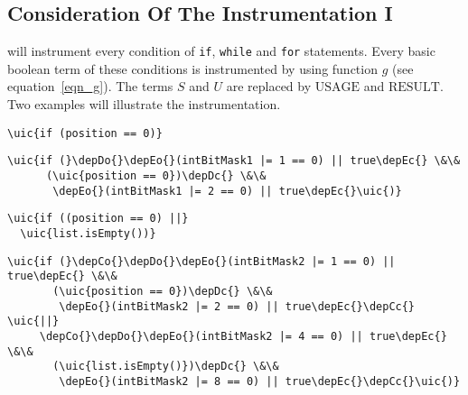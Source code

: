 \subsection{Consideration Of The Instrumentation I}
\gbt will instrument every condition of \texttt{if}, \texttt{while} and \texttt{for} statements. Every basic boolean term of these conditions is instrumented by using function $g$ (see equation~\eqref{eqn_g}). The terms $S$ and $U$ are replaced by $\text{USAGE}$ and $\text{RESULT}$. Two examples will illustrate the instrumentation.

\begin{minipage}[t]{0.35\textwidth}
\begin{Verbatim}[commandchars=\\\{\}]
\uic{if (position == 0)}
\end{Verbatim}
\end{minipage}
\begin{minipage}[t]{0.65\textwidth}
\begin{Verbatim}[commandchars=\\\{\}]
\uic{if (}\depDo{}\depEo{}(intBitMask1 |= 1 == 0) || true\depEc{} \&\&
      (\uic{position == 0})\depDc{} \&\&
       \depEo{}(intBitMask1 |= 2 == 0) || true\depEc{}\uic{)}
\end{Verbatim}
\end{minipage}
\newline
\newline

\begin{minipage}[t]{0.35\textwidth}
\begin{Verbatim}[commandchars=\\\{\}]
\uic{if ((position == 0) ||}
  \uic{list.isEmpty())}
\end{Verbatim}
\end{minipage}
\begin{minipage}[t]{0.65\textwidth}
\begin{Verbatim}[commandchars=\\\{\}]
\uic{if (}\depCo{}\depDo{}\depEo{}(intBitMask2 |= 1 == 0) || true\depEc{} \&\&
       (\uic{position == 0})\depDc{} \&\&
        \depEo{}(intBitMask2 |= 2 == 0) || true\depEc{}\depCc{} \uic{||}
     \depCo{}\depDo{}\depEo{}(intBitMask2 |= 4 == 0) || true\depEc{} \&\&
       (\uic{list.isEmpty()})\depDc{} \&\&
        \depEo{}(intBitMask2 |= 8 == 0) || true\depEc{}\depCc{}\uic{)}
\end{Verbatim}
\end{minipage}
\newline
\newline

